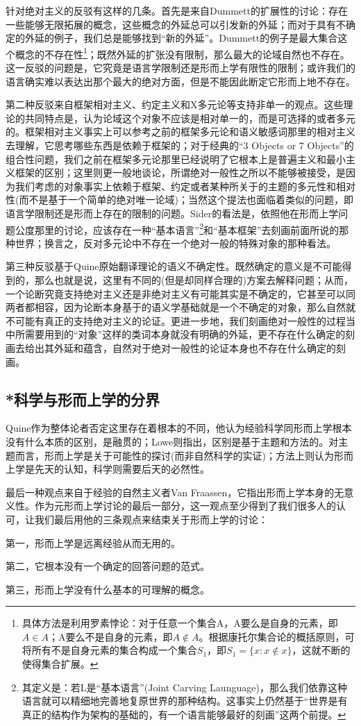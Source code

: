 \documentclass{article}
\begin{document}
针对绝对主义的反驳有这样的几条。首先是来自Dummett的扩展性的讨论：存在一些能够无限拓展的概念，这些概念的外延总可以引发新的外延；而对于具有不确定的外延的例子，我们总是能够找到“新的外延”。Dummett的例子是最大集合这个概念的不存在性\footnote{具体方法是利用罗素悖论：对于任意一个集合A，A要么是自身的元素，即$A\in A$；A要么不是自身的元素，即$A\notin A$。根据康托尔集合论的概括原则，可将所有不是自身元素的集合构成一个集合$S_1$，即$S_1=\{x:x\notin x\}$，这就不断的使得集合扩展。}；既然外延的扩张没有限制，那么最大的论域自然也不存在。这一反驳的问题是，它究竟是语言学限制还是形而上学有限性的限制；或许我们的语言确实难以表达出那个最大的绝对方面，但是不能因此断定它形而上地不存在。

第二种反驳来自框架相对主义、约定主义和X多元论等支持非单一的观点。这些理论的共同特点是，认为论域这个对象不应该是相对单一的，而是可选择的或者多元的。框架相对主义事实上可以参考之前的框架多元论和语义敏感词那里的相对主义去理解，它思考哪些东西是依赖于框架的；对于经典的“3 Objects or 7 Objects”的组合性问题，我们之前在框架多元论那里已经说明了它根本上是普遍主义和最小主义框架的区别；这里则更一般地谈论，所谓绝对一般性之所以不能够被接受，是因为我们考虑的对象事实上依赖于框架、约定或者某种所关于的主题的多元性和相对性(而不是基于一个简单的绝对唯一论域)；当然这个提法也面临着类似的问题，即语言学限制还是形而上存在的限制的问题。Sider的看法是，依照他在形而上学问题公度那里的讨论，应该存在一种“基本语言”\footnote{其定义是：若L是“基本语言”(Joint Carving Launguage)，那么我们依靠这种语言就可以精细地完善地复原世界的那种结构。这事实上仍然基于“世界是有真正的结构作为架构的基础的，有一个语言能够最好的刻画”这两个前提。}和“基本框架”去刻画前面所说的那种世界；换言之，反对多元论中不存在一个绝对一般的特殊对象的那种看法。

第三种反驳基于Quine原始翻译理论的语义不确定性。既然确定的意义是不可能得到的，那么也就是说，这里有不同的(但是却同样合理的)方案去解释问题；从而，一个论断究竟支持绝对主义还是非绝对主义有可能其实是不确定的，它甚至可以同两者都相容，因为论断本身基于的语义学基础就是一个不确定的对象，那么自然就不可能有真正的支持绝对主义的论证。更进一步地，我们刻画绝对一般性的过程当中所需要用到的“对象”这样的类词本身就没有明确的外延，更不存在什么确定的刻画去给出其外延和蕴含，自然对于绝对一般性的论证本身也不存在什么确定的刻画。
\subsection{*科学与形而上学的分界}
Quine作为整体论者否定这里存在着根本的不同，他认为经验科学同形而上学根本没有什么本质的区别，是融贯的；Lowe则指出，区别是基于主题和方法的。对主题而言，形而上学是关于可能性的探讨(而非自然科学的实证)；方法上则认为形而上学是先天的认知，科学则需要后天的必然性。

最后一种观点来自于经验的自然主义者Van Fraassen，它指出形而上学本身的无意义性。作为元形而上学讨论的最后一部分，这一观点至少得到了我们很多人的认可，让我们最后用他的三条观点来结束关于形而上学的讨论：

{\kaishu 第一，形而上学是远离经验从而无用的。}

{\kaishu 第二，它根本没有一个确定的回答问题的范式。}

{\kaishu 第三，形而上学没有什么基本的可理解的概念。}
\end{document}
